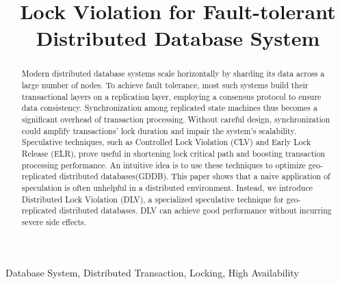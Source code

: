 \documentclass[conference]{IEEEtran}
\begin{document}
\title{Lock Violation for Fault-tolerant Distributed Database System}


\author{
\and
{}
\and
{}
}

\maketitle

\begin{abstract}
Modern distributed database systems scale horizontally by sharding its data across a large number of nodes.
To achieve fault tolerance, most such systems build their transactional layers on a replication layer,
employing a consensus protocol to ensure data consistency.
Synchronization among replicated state machines thus becomes a significant overhead of transaction processing.
Without careful design, synchronization could amplify transactions' lock duration and impair the system's scalability.
Speculative techniques, such as Controlled Lock Violation (CLV) and Early Lock Release (ELR), prove useful in shortening lock critical path and boosting transaction processing performance.
An intuitive idea is to use these techniques to optimize geo-replicated distributed databases(GDDB).
This paper shows that a naive application of speculation is often unhelpful in a distributed environment.
Instead, we introduce Distributed Lock Violation (DLV), a specialized speculative technique for geo-replicated distributed databases.
DLV can achieve good performance without incurring severe side effects.
\end{abstract}

\begin{IEEEkeywords}
Database System, Distributed Transaction, Locking, High Availability
\end{IEEEkeywords}
\end{document}
